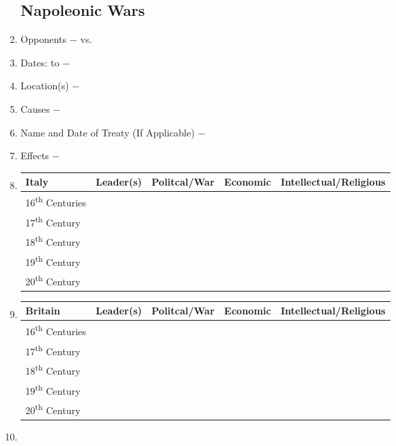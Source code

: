 \documentclass[12pt]{article}
\begin{document}
\begin{enumerate}
\subsection{Napoleonic Wars} 

\item Opponents $-$ vs.

\item Dates: to $-$

\item Location(s) $-$ 

\item Causes $-$

\item Name and Date of Treaty (If Applicable) $-$ 

\item Effects $-$ 

\item \begin{tabular}{l c c c c}

Italy & Leader(s) & Politcal/War & Economic & Intellectual/Religious \\
\hline
16\textsuperscript{th} Centuries & & & & \\
\hline
17\textsuperscript{th} Century & & & & \\
\hline
18\textsuperscript{th} Century & & & & \\
\hline
19\textsuperscript{th} Century & & & & \\
\hline
20\textsuperscript{th} Century & & & & \\

\end{tabular}

\item \begin{tabular}{l c c c c}

Britain & Leader(s) & Politcal/War & Economic & Intellectual/Religious \\
\hline
16\textsuperscript{th} Centuries & & & & \\
\hline
17\textsuperscript{th} Century & & & & \\
\hline
18\textsuperscript{th} Century & & & & \\
\hline
19\textsuperscript{th} Century & & & & \\
\hline
20\textsuperscript{th} Century & & & & \\

\end{tabular}

\item \begin{tabular}{l c c c c}


\end{tabular}
\end{enumerate}
\end{document}
